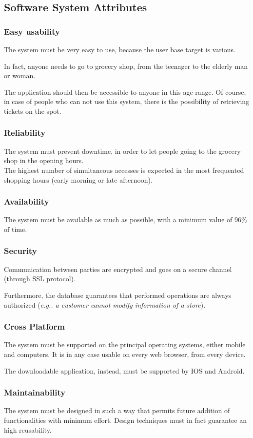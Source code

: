 \documentclass[table, 12pt]{article}
\begin{document}
\subsection{Software System Attributes}
\subsubsection{Easy usability}
The system must be very easy to use, because the user base target is various.

In fact, anyone needs to go to grocery shop, from the teenager to the elderly man or woman.

The application should then be accessible to anyone in this age range. Of course, in case of people who can not use this system, there is the possibility of retrieving tickets on the spot.
\subsubsection{Reliability}
The system must prevent downtime, in order to let people going to the grocery shop in the opening hours. \\
The highest number of simultaneous accesses is expected in the most frequented shopping hours (early morning or late afternoon).
\subsubsection{Availability}
The system must be available as much as possible, with a minimum value of 96\% of time.
\subsubsection{Security}
Communication between parties are encrypted and goes on a secure channel (through SSL protocol).

Furthermore, the database guarantees that performed operations are always authorized (\textit{e.g.. a customer cannot modify information of a store}).
\subsubsection{Cross Platform}
The system must be supported on the principal operating systems, either mobile and computers. It is in any case usable on every web browser, from every device.

The downloadable application, instead, must be supported by IOS and Android.
\subsubsection{Maintainability}
The system must be designed in such a way that permits future addition of functionalities with minimum effort.
Design techniques must in fact guarantee an high reusability.
\end{document}
